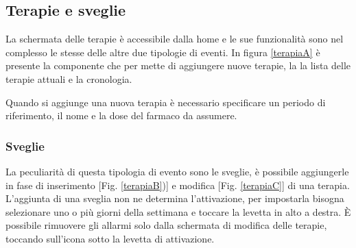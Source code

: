 \documentclass[12pt,a4paper,openright,twoside]{report}
\begin{document}
\subsection{Terapie e sveglie}
La schermata delle terapie è accessibile dalla home e le sue funzionalità sono nel complesso le stesse delle altre due tipologie di eventi. 
In figura \ref{terapiaA} è presente la componente che per mette di aggiungere nuove terapie, la la lista delle terapie attuali e la cronologia. 

Quando si aggiunge una nuova terapia è necessario specificare un periodo di riferimento, il nome e la dose del farmaco da assumere.

\subsubsection{Sveglie}
La peculiarità di questa tipologia di evento sono le sveglie, è possibile aggiungerle in fase di inserimento [Fig. \ref{terapiaB})] e modifica [Fig. \ref{terapiaC}] di una terapia. L'aggiunta di una sveglia non ne determina l'attivazione, per impostarla bisogna selezionare uno o più giorni della settimana e toccare la levetta in alto a destra. \`E possibile rimuovere gli allarmi solo dalla schermata di modifica delle terapie, toccando sull'icona sotto la levetta di attivazione.
\end{document}
